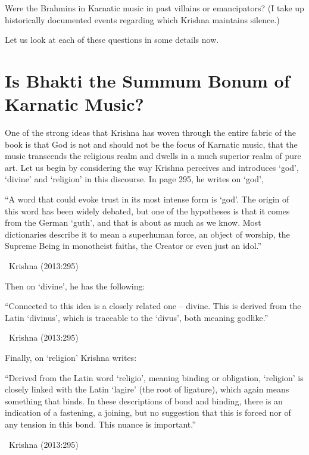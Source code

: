  \item Were the Brahmins in Karnatic music in past villains or emancipators? (I take up historically documented events regarding which Krishna maintains silence.)

Let us look at each of these questions in some details now.


\section*{Is Bhakti the Summum Bonum of Karnatic Music?}

One of the strong ideas that Krishna has woven through the entire fabric of the book is that God is not and should not be the focus of Karnatic music, that the music transcends the religious realm and dwells in a much superior realm of pure art. Let us begin by considering the way Krishna perceives and introduces ‘god’, ‘divine’ and ‘religion’ in this discourse. In page 295, he writes on ‘god’,

\begin{myquote}
“A word that could evoke trust in its most intense form is ‘god’. The origin of this word has been widely debated, but one of the hypotheses is that it comes from the German ‘guth’, and that is about as much as we know. Most dictionaries describe it to mean a superhuman force, an object of worship, the Supreme Being in monotheist faiths, the Creator or even just an idol.” 

~\hfill Krishna (2013:295)
\end{myquote}

Then on ‘divine’, he has the following:

\begin{myquote}
“Connected to this idea is a closely related one – divine. This is derived from the Latin ‘divinus’, which is traceable to the ‘divus’, both meaning godlike.” 

~\hfill Krishna (2013:295)
\end{myquote}

Finally, on ‘religion’ Krishna writes:

\begin{myquote}
“Derived from the Latin word ‘religio’, meaning binding or obligation, ‘religion’ is closely linked with the Latin ‘lagire’ (the root of ligature), which again means something that binds. In these descriptions of bond and binding, there is an indication of a fastening, a joining, but no suggestion that this is forced nor of any tension in this bond. This nuance is important.” 

~\hfill Krishna (2013:295)
\end{myquote}

